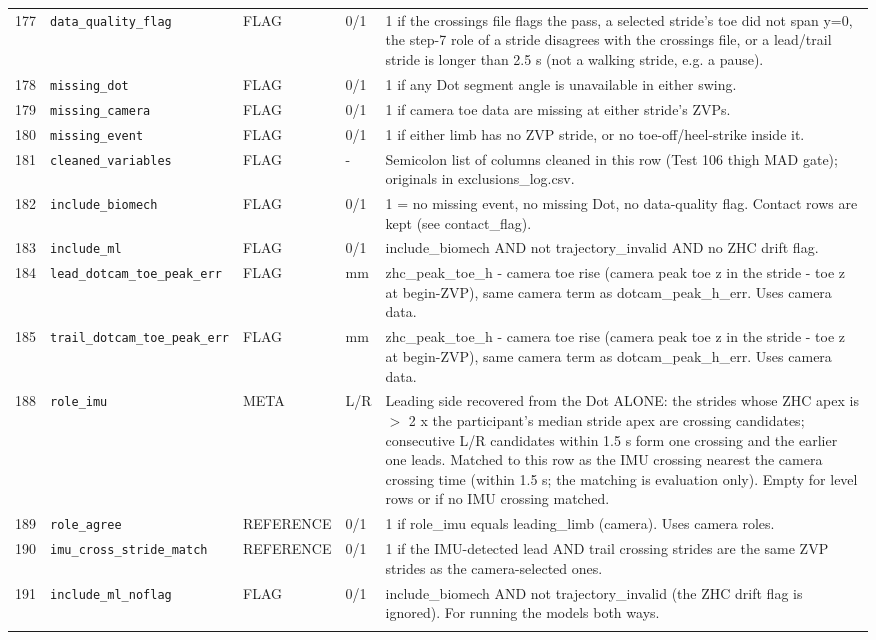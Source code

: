 \begin{longtable}{@{}r p{3.6cm} p{1.55cm} p{1.15cm} p{8.6cm}@{}}
177 & \texttt{data\_\allowbreak{}quality\_\allowbreak{}flag} & FLAG & 0/1 & 1 if the crossings file flags the pass, a selected stride's toe did not span y=0, the step-7 role of a stride disagrees with the crossings file, or a lead/trail stride is longer than 2.5 s (not a walking stride, e.g. a pause). \\
178 & \texttt{missing\_\allowbreak{}dot} & FLAG & 0/1 & 1 if any Dot segment angle is unavailable in either swing. \\
179 & \texttt{missing\_\allowbreak{}camera} & FLAG & 0/1 & 1 if camera toe data are missing at either stride's ZVPs. \\
180 & \texttt{missing\_\allowbreak{}event} & FLAG & 0/1 & 1 if either limb has no ZVP stride, or no toe-off/heel-strike inside it. \\
181 & \texttt{cleaned\_\allowbreak{}variables} & FLAG & - & Semicolon list of columns cleaned in this row (Test 106 thigh MAD gate); originals in exclusions\_log.csv. \\
182 & \texttt{include\_\allowbreak{}biomech} & FLAG & 0/1 & 1 = no missing event, no missing Dot, no data-quality flag. Contact rows are kept (see contact\_flag). \\
183 & \texttt{include\_\allowbreak{}ml} & FLAG & 0/1 & include\_biomech AND not trajectory\_invalid AND no ZHC drift flag. \\
184 & \texttt{lead\_\allowbreak{}dotcam\_\allowbreak{}toe\_\allowbreak{}peak\_\allowbreak{}err} & FLAG & mm & zhc\_peak\_toe\_h - camera toe rise (camera peak toe z in the stride - toe z at begin-ZVP), same camera term as dotcam\_peak\_h\_err. Uses camera data. \\
185 & \texttt{trail\_\allowbreak{}dotcam\_\allowbreak{}toe\_\allowbreak{}peak\_\allowbreak{}err} & FLAG & mm & zhc\_peak\_toe\_h - camera toe rise (camera peak toe z in the stride - toe z at begin-ZVP), same camera term as dotcam\_peak\_h\_err. Uses camera data. \\
188 & \texttt{role\_\allowbreak{}imu} & META & L/R & Leading side recovered from the Dot ALONE: the strides whose ZHC apex is $>$ 2 x the participant's median stride apex are crossing candidates; consecutive L/R candidates within 1.5 s form one crossing and the earlier one leads. Matched to this row as the IMU crossing nearest the camera crossing time (within 1.5 s; the matching is evaluation only). Empty for level rows or if no IMU crossing matched. \\
189 & \texttt{role\_\allowbreak{}agree} & REFERENCE & 0/1 & 1 if role\_imu equals leading\_limb (camera). Uses camera roles. \\
190 & \texttt{imu\_\allowbreak{}cross\_\allowbreak{}stride\_\allowbreak{}match} & REFERENCE & 0/1 & 1 if the IMU-detected lead AND trail crossing strides are the same ZVP strides as the camera-selected ones. \\
191 & \texttt{include\_\allowbreak{}ml\_\allowbreak{}noflag} & FLAG & 0/1 & include\_biomech AND not trajectory\_invalid (the ZHC drift flag is ignored). For running the models both ways. \\
\addlinespace
\end{longtable}
\endgroup

